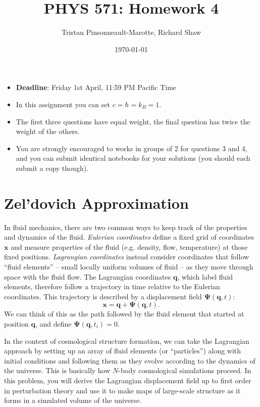 \documentclass[12pt]{article}
\author{Tristan Pinsonneault-Marotte, Richard Shaw}
\title{PHYS 571: Homework 4}
\date{\today}
\begin{document}
\maketitle

\begin{itemize}
    \item \textbf{Deadline}: Friday 1st April, 11:59 PM Pacific Time
    \item In this assignment you can set $c = \hbar = k_B = 1$.
    \item The first three questions have equal weight, the final question has twice the weight of the others.
    \item You are strongly encouraged to works in groups of 2 for questions 3 and 4, and you can submit identical notebooks for your solutions (you should each submit a copy though).
\end{itemize}

\section{Zel'dovich Approximation}

In fluid mechanics, there are two common ways to keep track of the properties
and dynamics of the fluid. \emph{Eulerian coordinates} define a fixed grid of
coordinates $\mathbf{x}$ and measure properties of the fluid (e.g. density,
flow, temperature) at those fixed positions. \emph{Lagrangian coordinates}
instead consider coordinates that follow ``fluid elements'' -- small locally
uniform volumes of fluid -- as they move through space with the fluid flow. The
Lagrangian coordinates $\mathbf{q}$, which label fluid elements, therefore
follow a trajectory in time relative to the Eulerian coordinates. This
trajectory is described by a displacement field $\mathbf{\Psi}(\mathbf{q}, t)$:
\begin{equation}
    \mathbf{x} = \mathbf{q} + \mathbf{\Psi}(\mathbf{q}, t) \text{.}
\end{equation}
We can think of this as the path followed by the fluid element that started at
position $\mathbf{q}$, and define $\mathbf{\Psi}(\mathbf{q}, t_i) = 0$.

In the context of cosmological structure formation, we can take the Lagrangian
approach by setting up an array of fluid elements (or ``particles'') along with
initial conditions and following them as they evolve according to the dynamics
of the universe. This is basically how $N$-body cosmological simulations
proceed. In this problem, you will derive the Lagrangian displacement field up
to first order in perturbation theory and use it to make maps of large-scale
structure as it forms in a simulated volume of the universe.
\end{document}
